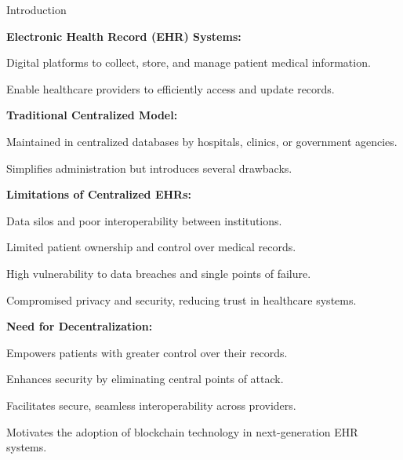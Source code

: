 \documentclass[10pt]{beamer}
\let\olditemize\itemize
\let\endolditemize\enditemize
\renewenvironment{itemize}
  {\olditemize\justifying}
  {\endolditemize}
\begin{document}
\begin{frame}{Introduction}
\small
\begin{itemize}
    \item \textbf{Electronic Health Record (EHR) Systems:}  
        \begin{itemize}
            \item Digital platforms to collect, store, and manage patient medical information.
            \item Enable healthcare providers to efficiently access and update records.
        \end{itemize}

    \item \textbf{Traditional Centralized Model:}  
        \begin{itemize}
            \item Maintained in centralized databases by hospitals, clinics, or government agencies.
            \item Simplifies administration but introduces several drawbacks.
        \end{itemize}

    \item \textbf{Limitations of Centralized EHRs:}  
        \begin{itemize}
            \item Data silos and poor interoperability between institutions.
            \item Limited patient ownership and control over medical records.
            \item High vulnerability to data breaches and single points of failure.
            \item Compromised privacy and security, reducing trust in healthcare systems.
        \end{itemize}

    \item \textbf{Need for Decentralization:}  
        \begin{itemize}
            \item Empowers patients with greater control over their records.
            \item Enhances security by eliminating central points of attack.
            \item Facilitates secure, seamless interoperability across providers.
            \item Motivates the adoption of blockchain technology in next-generation EHR systems.
        \end{itemize}
\end{itemize}
\end{frame}
\end{document}
